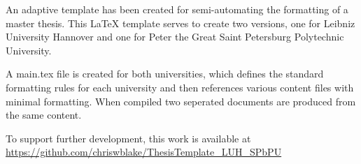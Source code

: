 \label{chap:conclusions}
An adaptive template has been created for semi-automating the formatting of a master thesis. This LaTeX template serves to create two versions, one for Leibniz University Hannover and one for Peter the Great Saint Petersburg Polytechnic University.

A main.tex file is created for both universities, which defines the standard formatting rules for each university and then references various content files with minimal formatting. When compiled two seperated documents are produced from the same content.

To support further development, this work is available at \url{https://github.com/chriswblake/ThesisTemplate_LUH_SPbPU}